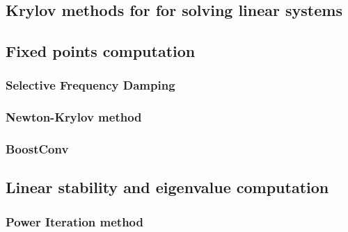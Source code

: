 
  \subsection{Krylov methods for for solving linear systems}
  \label{subsubsec: theory -- krylov methods}




  \subsection{Fixed points computation}
  \label{subsec: numerics-fixed points computation}
    \subsubsection{Selective Frequency Damping}

    \subsubsection{Newton-Krylov method}

    \subsubsection{BoostConv}





  \subsection{Linear stability and eigenvalue computation}

    \subsubsection{Power Iteration method}

